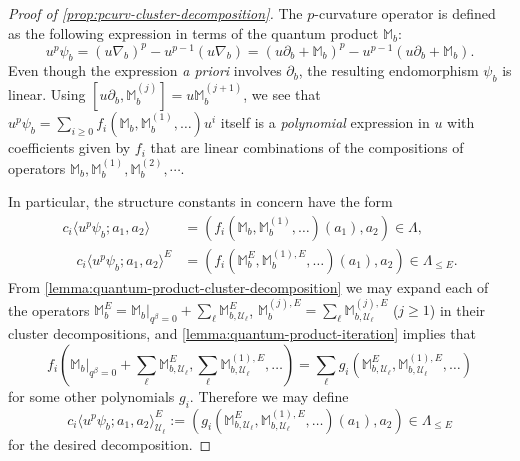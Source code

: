 \documentclass[reqno]{amsart}
\numberwithin{equation}{section}
\numberwithin{equation}{section}
\numberwithin{equation}{section}
\theoremstyle{definition}
\theoremstyle{remark}
\theoremstyle{remark}
\begin{document}
\begin{proof}[Proof of \cref{prop:pcurv-cluster-decomposition}]
    The $p$-curvature operator is defined as the following expression in terms of the quantum product $\mathbb{M}_b$:
\begin{equation}
    u^p \psi_b = (u\nabla_b)^p - u^{p-1}(u\nabla_b) = (u \partial_b + \mathbb{M}_b)^p - u^{p-1}(u \partial_b + \mathbb{M}_b).
\end{equation}
Even though the expression \emph{a priori} involves $\partial_b$, the resulting endomorphism $\psi_b$ is linear. Using $[u \partial_b, \mathbb{M}_b^{(j)}] = u \mathbb{M}_b^{(j+1)}$, we see that $u^p \psi_b = \sum_{i \ge 0} f_i (\mathbb{M}_b, \mathbb{M}_b^{(1)}, \dots) u^i$ itself is a \emph{polynomial} expression in $u$ with coefficients given by $f_i$ that are linear combinations of  the compositions of operators $\mathbb{M}_b, \mathbb{M}_b^{(1)}, \mathbb{M}_b^{(2)}, \cdots$.

In particular, the structure constants in concern have the form
\begin{align}
    c_i \langle u^p \psi_b;a_1, a_2\rangle &= \left( f_i (\mathbb{M}_b, \mathbb{M}_b^{(1)}, \dots)(a_1), a_2 \right) \in \Lambda, \\ \quad 
    c_i \langle u^p  \psi_b;a_1, a_2\rangle^E &= \left( f_i (\mathbb{M}_b^E, \mathbb{M}_b^{(1), E}, \dots) (a_1), a_2 \right) \in \Lambda_{\le E}.
\end{align}
From \cref{lemma:quantum-product-cluster-decomposition} we may expand each of the operators $\mathbb{M}_b^E = \mathbb{M}_b|_{q^\beta = 0} + \sum_\ell \mathbb{M}_{b, \mathcal{U}_\ell}^E$,  $\mathbb{M}_b^{(j), E} = \sum_\ell \mathbb{M}_{b, \mathcal{U}_\ell}^{(j), E} $ ($j \ge 1$) in their cluster decompositions, and \cref{lemma:quantum-product-iteration} implies that
\begin{equation}
    f_i \left(\mathbb{M}_b|_{q^\beta = 0} + \sum_\ell \mathbb{M}_{b, \mathcal{U}_\ell}^{E}, \sum_\ell \mathbb{M}_{b, \mathcal{U}_\ell}^{(1), E}, \dots \right) = \sum_\ell g_i \left( \mathbb{M}_{b, \mathcal{U}_\ell}^{E}, \mathbb{M}_{b, \mathcal{U}_\ell}^{(1), E}, \dots \right)
\end{equation}
for some other polynomials $g_i$. Therefore we may define
\begin{equation}
    c_i \langle  u^p  \psi_b; a_1, a_2 \rangle ^E_{\mathcal{U}_\ell}  := \left( g_i (\mathbb{M}_{b, \mathcal{U}_\ell}^E, \mathbb{M}_{b, \mathcal{U}_\ell}^{(1), E}, \dots) (a_1), a_2 \right) \in \Lambda_{\le E}
\end{equation}
for the desired decomposition.
\end{proof}
\end{document}
